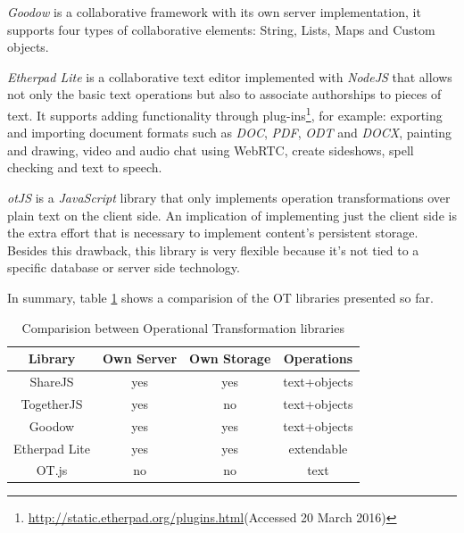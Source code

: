 	\emph{Goodow} is a collaborative framework with its own server implementation, it supports four types of collaborative elements: String, Lists, Maps and Custom objects.
	

	\emph{Etherpad Lite} is a collaborative text editor implemented with \emph{NodeJS} that allows not only the basic text operations but also to associate authorships to pieces of text. It supports adding functionality through plug-ins\footnote{\url{http://static.etherpad.org/plugins.html}(Accessed 20 March 2016)}, for example: exporting and importing document formats such as \emph{DOC}, \emph{PDF}, \emph{ODT} and \emph{DOCX}, painting and drawing, video and audio chat using WebRTC, create sideshows, spell checking and text to speech.
	


	\emph{otJS} is a \emph{JavaScript} library that only implements operation transformations over plain text on the client side. An implication of implementing just the client side is the extra effort that is necessary to implement content's persistent storage. Besides this drawback, this library is very flexible because it's not tied to a specific database or server side technology.
	

	In summary, table \ref{table:otcomparision} shows a comparision of the \ac{OT} libraries presented so far.

\begin{table}
\centering
\caption{Comparision between Operational Transformation libraries}
\label{table:otcomparision}
\begin{tabular}{|c|c|c|c|}
\hline
\textbf{Library} & \textbf{Own Server} & \textbf{Own Storage} & \textbf{Operations} \\ \hline
ShareJS          & yes                 & yes                  & text+objects        \\ \hline
TogetherJS       & yes                 & no                   & text+objects        \\ \hline
Goodow           & yes                 & yes                  & text+objects        \\ \hline
Etherpad Lite    & yes                 & yes                  & extendable 			    \\ \hline
OT.js            & no                  & no                   & text                \\ \hline
\end{tabular}
\end{table}


